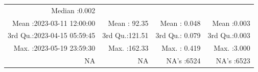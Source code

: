 \documentclass[
  10pt,
  a4paper,oneside]{article}
\begin{document}
\begin{longtable}[]{@{}rrrr@{}}
\begin{minipage}[t]{0.19\columnwidth}
Median :0.002\strut
\end{minipage}\tabularnewline
\begin{minipage}[t]{0.33\columnwidth}\raggedleft
Mean :2023-03-11 12:00:00\strut
\end{minipage} & \begin{minipage}[t]{0.19\columnwidth}\raggedleft
Mean : 92.35\strut
\end{minipage} & \begin{minipage}[t]{0.19\columnwidth}\raggedleft
Mean : 0.048\strut
\end{minipage} & \begin{minipage}[t]{0.19\columnwidth}\raggedleft
Mean :0.003\strut
\end{minipage}\tabularnewline
\begin{minipage}[t]{0.33\columnwidth}\raggedleft
3rd Qu.:2023-04-15 05:59:45\strut
\end{minipage} & \begin{minipage}[t]{0.19\columnwidth}\raggedleft
3rd Qu.:121.51\strut
\end{minipage} & \begin{minipage}[t]{0.19\columnwidth}\raggedleft
3rd Qu.: 0.079\strut
\end{minipage} & \begin{minipage}[t]{0.19\columnwidth}\raggedleft
3rd Qu.:0.003\strut
\end{minipage}\tabularnewline
\begin{minipage}[t]{0.33\columnwidth}\raggedleft
Max. :2023-05-19 23:59:30\strut
\end{minipage} & \begin{minipage}[t]{0.19\columnwidth}\raggedleft
Max. :162.33\strut
\end{minipage} & \begin{minipage}[t]{0.19\columnwidth}\raggedleft
Max. : 0.419\strut
\end{minipage} & \begin{minipage}[t]{0.19\columnwidth}\raggedleft
Max. :3.000\strut
\end{minipage}\tabularnewline
\begin{minipage}[t]{0.33\columnwidth}\raggedleft
NA\strut
\end{minipage} & \begin{minipage}[t]{0.19\columnwidth}\raggedleft
NA\strut
\end{minipage} & \begin{minipage}[t]{0.19\columnwidth}\raggedleft
NA's :6524\strut
\end{minipage} & \begin{minipage}[t]{0.19\columnwidth}\raggedleft
NA's :6523\strut
\end{minipage}\tabularnewline
\bottomrule
\end{longtable}
\end{document}
